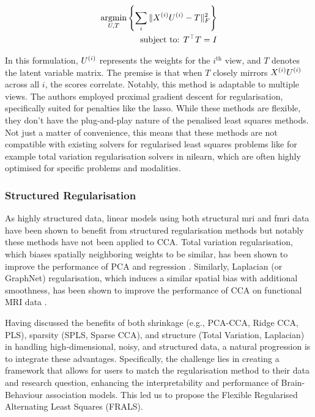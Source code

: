 \begin{align}
    \label{eq:fu}
    \underset{U, T}{\mathrm{argmin}}\left\{\sum_i \|X^{(i)} U^{(i)} - T\|_F^2\right\}\\
    \text{subject to: }T^\top T = I\\
\end{align}

In this formulation, \(U^{(i)}\) represents the \gls{weights} for the $i^{\text{th}}$ view, and \(T\) denotes the latent variable matrix.
The premise is that when \(T\) closely mirrors \(X^{(i)} U^{(i)}\) across all \(i\), the scores correlate.
Notably, this method is adaptable to multiple views.
The authors employed proximal gradient descent for regularisation, specifically suited for penalties like the lasso.
While these methods are flexible, they don't have the plug-and-play nature of the penalised least squares methods.
Not just a matter of convenience, this means that these methods are not compatible with existing solvers for regularised least squares problems like for example total variation regularisation solvers in nilearn, which are often highly optimised for specific problems and modalities.

\subsubsection{Structured Regularisation}

As highly structured data, linear models using both structural \acrshort{mri} and f\acrshort{mri} data have been shown to benefit from structured regularisation methods but notably these methods have not been applied to CCA.
Total variation regularisation, which biases spatially neighboring weights to be similar, has been shown to improve the performance of PCA \citep{de2017structured} and regression \citep{michel2011total,dohmatob2014benchmarking, baldassarre2012structured}.
Similarly, Laplacian (or GraphNet) regularisation, which induces a similar spatial bias with additional smoothness, has been shown to improve the performance of CCA on functional MRI data \citep{grosenick2013interpretable,cuingnet2012spatial}.

Having discussed the benefits of both shrinkage (e.g., PCA-CCA, Ridge CCA, PLS), sparsity (SPLS, Sparse CCA), and structure (Total Variation, Laplacian) in handling high-dimensional, noisy, and structured data, a natural progression is to integrate these advantages.
Specifically, the challenge lies in creating a framework that allows for users to match the regularisation method to their data and research question, enhancing the interpretability and performance of Brain-Behaviour association models.
This led us to propose the Flexible Regularised Alternating Least Squares (FRALS).

